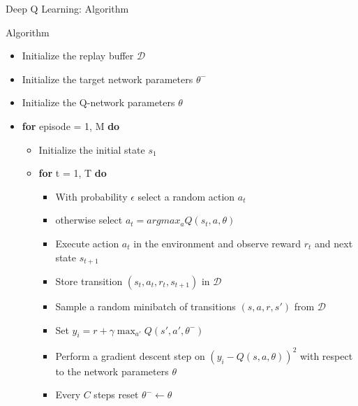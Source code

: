 \documentclass[presentation, 9pt]{beamer}\mode<presentation>{\usetheme{AMSBolognaFC}}
\begin{document}
\begin{frame}{Deep Q Learning: Algorithm}
	\begin{block}{Algorithm}
		\begin{itemize}
			\item Initialize the replay buffer $\mathcal{D}$
			\item Initialize the target network parameters $\theta^-$
			\item Initialize the Q-network parameters $\theta$
			\item \textbf{for} episode = 1, M \textbf{do}
			\begin{itemize}
				\item Initialize the initial state $s_1$
				\item \textbf{for} t = 1, T \textbf{do}
				\begin{itemize}
					\item With probability $\epsilon$ select a random action $a_t$
					\item otherwise select $a_t = argmax_a Q(s_t, a, \theta)$
					\item Execute action $a_t$ in the environment and observe reward $r_t$ and next state $s_{t+1}$
					\item Store transition $(s_t, a_t, r_t, s_{t+1})$ in $\mathcal{D}$
					\item Sample a random minibatch of transitions $(s, a, r, s')$ from $\mathcal{D}$
					\item Set $y_i = r + \gamma \max_{a'} Q(s', a', \theta^-)$
					\item Perform a gradient descent step on $(y_i - Q(s, a, \theta))^2$ with respect to the network parameters $\theta$
					\item Every $C$ steps reset $\theta^- \leftarrow \theta$
				\end{itemize}
			\end{itemize}
		\end{itemize}
	\end{block}
\end{frame}
\end{document}

